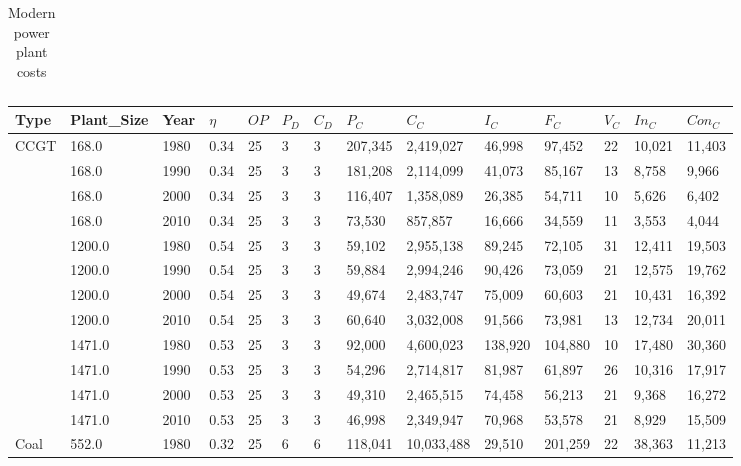 \begin{table*}[]
\begin{tabularx}{\linewidth}{|p{}|l|x|l|l|l|l|l|l|l|l|l|l|l|}
	\end{tabularx}
		\caption{Modern power plant costs \cite{Department2016}}
		\label{table:modern_plant_costs}
\end{table*}


\begin{table}[]
	\begin{tabular}{|l|l|l|l|l|l|l|l|l|l|l|l|l|l|}
		\hline
		Type & Plant\_Size & Year & $\eta$ & $OP$ & $P_D$ & $C_D$ & $P_C$ & $C_C$ & $I_C$ & $F_C$ & $V_C$ & $In_C$ & $Con_C$ \\ \hline
		\multirow{12}{*}{CCGT} & 168.0 & 1980 & 0.34 & 25 & 3 & 3 & 207,345 & 2,419,027 & 46,998 & 97,452 & 22 & 10,021 & 11,403 \\ \cline{2-14} 
		& 168.0 & 1990 & 0.34 & 25 & 3 & 3 & 181,208 & 2,114,099 & 41,073 & 85,167 & 13 & 8,758 & 9,966 \\ \cline{2-14} 
		& 168.0 & 2000 & 0.34 & 25 & 3 & 3 & 116,407 & 1,358,089 & 26,385 & 54,711 & 10 & 5,626 & 6,402 \\ \cline{2-14} 
		& 168.0 & 2010 & 0.34 & 25 & 3 & 3 & 73,530 & 857,857 & 16,666 & 34,559 & 11 & 3,553 & 4,044 \\ \cline{2-14} 
		& 1200.0 & 1980 & 0.54 & 25 & 3 & 3 & 59,102 & 2,955,138 & 89,245 & 72,105 & 31 & 12,411 & 19,503 \\ \cline{2-14} 
		& 1200.0 & 1990 & 0.54 & 25 & 3 & 3 & 59,884 & 2,994,246 & 90,426 & 73,059 & 21 & 12,575 & 19,762 \\ \cline{2-14} 
		& 1200.0 & 2000 & 0.54 & 25 & 3 & 3 & 49,674 & 2,483,747 & 75,009 & 60,603 & 21 & 10,431 & 16,392 \\ \cline{2-14} 
		& 1200.0 & 2010 & 0.54 & 25 & 3 & 3 & 60,640 & 3,032,008 & 91,566 & 73,981 & 13 & 12,734 & 20,011 \\ \cline{2-14} 
		& 1471.0 & 1980 & 0.53 & 25 & 3 & 3 & 92,000 & 4,600,023 & 138,920 & 104,880 & 10 & 17,480 & 30,360 \\ \cline{2-14} 
		& 1471.0 & 1990 & 0.53 & 25 & 3 & 3 & 54,296 & 2,714,817 & 81,987 & 61,897 & 26 & 10,316 & 17,917 \\ \cline{2-14} 
		& 1471.0 & 2000 & 0.53 & 25 & 3 & 3 & 49,310 & 2,465,515 & 74,458 & 56,213 & 21 & 9,368 & 16,272 \\ \cline{2-14} 
		& 1471.0 & 2010 & 0.53 & 25 & 3 & 3 & 46,998 & 2,349,947 & 70,968 & 53,578 & 21 & 8,929 & 15,509 \\ \hline
		\multirow{24}{*}{Coal} & 552.0 & 1980 & 0.32 & 25 & 6 & 6 & 118,041 & 10,033,488 & 29,510 & 201,259 & 22 & 38,363 & 11,213 \\ \cline{2-14} 

\end{tabular}
\end{table}
